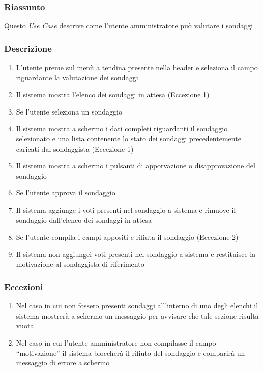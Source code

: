         \subsubsection{Riassunto}
            Questo \textit{Use Case} descrive come l'utente amministratore può valutare i sondaggi 
        \subsubsection{Descrizione}
            \begin{enumerate}
                \item L'utente preme sul menù a tendina presente nella header e seleziona il campo riguardante la valutazione dei sondaggi
                \item Il sistema mostra l'elenco dei sondaggi in attesa (Eccezione 1)
                \item Se l'utente seleziona un sondaggio
                \item Il sistema mostra a schermo i dati completi riguardanti il sondaggio selezionato e una lista contenente lo stato dei sondaggi precedentemente caricati dal sondaggista (Eccezione 1)
                \item Il sistema mostra a schermo i pulsanti di apporvazione o disapprovazione del sondaggio
                \item Se l'utente approva il sondaggio
                \item Il sistema aggiunge i voti presenti nel sondaggio a sistema e rimuove il sondaggio dall'elenco dei sondaggi in attesa
                \item Se l'utente compila i campi appositi e rifiuta il sondaggio (Eccezione 2)
                \item Il sistema non aggiungei voti presenti nel sondaggio a sistema e restituisce la motivazione al sondaggista di riferimento
            \end{enumerate}
        \subsubsection{Eccezioni}
            \begin{enumerate}
                \item Nel caso in cui non fossero presenti sondaggi all'interno di uno degli elenchi il sistema mostrerà a schermo un messaggio per avvisare che tale sezione risulta vuota
                \item Nel caso in cui l'utente amministratore non compilasse il campo ``motivazione'' il sistema bloccherà il rifiuto del sondaggio e comparirà un messaggio di errore a schermo
            \end{enumerate}

